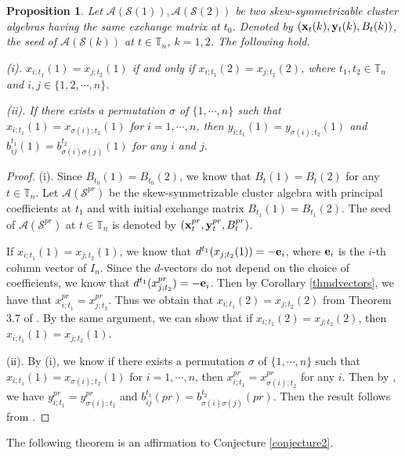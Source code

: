 \documentclass[14pt]{amsart}
\newtheorem{Proposition}[Theorem]{Proposition}
\begin{document}
\begin{Proposition}\label{proclustervariable}
Let $\mathcal A(\mathcal S(1)), \mathcal A(\mathcal S(2))$ be two skew-symmetrizable cluster algebras having the same exchange matrix at $t_0$.  Denoted by $({\bf x}_t(k),{\bf y}_t(k), B_t(k))$, the seed of $\mathcal A(\mathcal S(k))$ at $t\in\mathbb T_n$, $k=1,2$. The following hold.

 (i). $x_{i;t_1}(1)=x_{j;t_2}(1)$ if and only if $x_{i;t_1}(2)=x_{j;t_2}(2)$, where $t_1,t_2\in\mathbb T_n$ and $i,j\in\{1,2,\cdots,n\}$.

 (ii). If there exists a permutation $\sigma$ of $\{1,\cdots,n\}$ such that $x_{i;t_1}(1)=x_{\sigma(i);t_2}(1)$ for $i=1,\cdots,n$, then $y_{i;t_1}(1)=y_{\sigma(i);t_2}(1)$ and $b_{ij}^{t_1}(1)=b_{\sigma(i)\sigma(j)}^{t_2}(1)$ for any $i$ and $j$.
\end{Proposition}
\begin{proof}
(i). Since $B_{t_0}(1)=B_{t_0}(2)$, we know that $B_{t}(1)=B_{t}(2)$ for any $t\in\mathbb T_n$.
Let $\mathcal A(\mathcal S^{pr})$ be the skew-symmetrizable cluster algebra with principal coefficients at $t_1$ and with initial exchange matrix $B_{t_1}(1)=B_{t_1}(2)$.
The seed of $\mathcal A(\mathcal S^{pr})$ at $t\in\mathbb T_n$ is denoted by $({\bf x}_t^{pr},{\bf y}_t^{pr},B_{t}^{pr})$.

If $x_{i;t_1}(1)=x_{j;t_2}(1)$, we know that $d^{t_1}(x_{j;t_2}(1))=-{\bf e}_i$, where ${\bf e}_i$ is the $i$-th column vector of $I_n$. Since the $d$-vectors do not depend on the choice of coefficients, we know that $d^{t_1}(x_{j;t_2}^{pr})=-{\bf e}_i$. Then by Corollary \ref{thmdvectors}, we have that $x_{i;t_1}^{pr}=x_{j;t_2}^{pr}$.
Thus we obtain that $x_{i;t_1}(2)=x_{j;t_2}(2)$ from Theorem 3.7 of \cite{FZ3}.
By the same argument, we can show that if $x_{i;t_1}(2)=x_{j;t_2}(2)$, then $x_{i;t_1}(1)=x_{j;t_2}(1)$.

(ii). By (i), we know if there exists a permutation $\sigma$ of $\{1,\cdots,n\}$ such that $x_{i;t_1}(1)=x_{\sigma(i);t_2}(1)$ for $i=1,\cdots,n$, then $x_{i;t_1}^{pr}=x_{\sigma(i);t_2}^{pr}$ for any $i$.
Then by \cite[Theorem 4]{GSV}, we have $y_{i;t_1}^{pr}=y_{\sigma(i);t_2}^{pr}$ and $b_{ij}^{t_1}(pr)=b_{\sigma(i)\sigma(j)}^{t_2}(pr)$. Then the result follows from \cite[Theorem 4.6]{FZ3}.
\end{proof}



The following theorem is an affirmation to  Conjecture \ref{conjecture2}.
\end{document}
